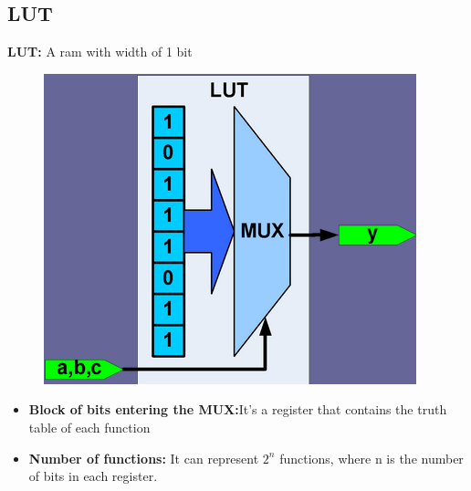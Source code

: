 \documentclass[12 pt]{article}
\begin{document}
\subsection*{LUT}
\textbf{LUT:} A ram with width of 1 bit
    \begin{figure}[H]
    \centering
    \includegraphics[scale=0.4]{./images/micro5}
    \label{micro5} 
\end{figure}
\begin{itemize}
    \item \textbf{Block of bits entering the MUX:}It's a register that contains the truth table of each function
    \item\textbf{Number of functions:} It can represent $2^n$ functions, where n is the number of bits in each register.
\end{itemize}
\end{document}
